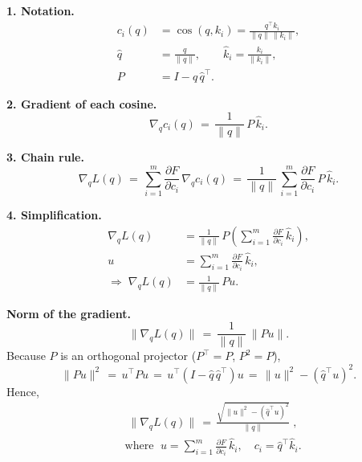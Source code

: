 \noindent\textbf{1. Notation.}
\begin{equation}
\begin{aligned}
c_i(q) &= \cos(q,k_i) = \frac{q^{\!\top}k_i}{\|q\|\,\|k_i\|}, \\
\hat q &= \frac{q}{\|q\|}, \qquad \hat k_i = \frac{k_i}{\|k_i\|}, \\
P &= I - \hat q\,\hat q^{\!\top}.
\end{aligned}
\end{equation}

\noindent\textbf{2. Gradient of each cosine.}
\begin{equation}
\nabla_q c_i(q) \,=\, \frac{1}{\|q\|}\,P\,\hat k_i.
\end{equation}

\noindent\textbf{3. Chain rule.}
\begin{equation}
\nabla_q L(q) \,=\, \sum_{i=1}^{m} \frac{\partial F}{\partial c_i}\,\nabla_q c_i(q) \,=\, \frac{1}{\|q\|}\,\sum_{i=1}^{m} \frac{\partial F}{\partial c_i}\,P\,\hat k_i.
\end{equation}

\noindent\textbf{4. Simplification.}
\begin{equation}
\begin{aligned}
\nabla_q L(q)
&= \frac{1}{\|q\|}\,P\left( \sum_{i=1}^{m} \frac{\partial F}{\partial c_i}\,\hat k_i \right), \\
u &= \sum_{i=1}^{m} \frac{\partial F}{\partial c_i}\,\hat k_i, \\
\Rightarrow\; \nabla_q L(q) &= \frac{1}{\|q\|}\,P u.
\end{aligned}
\end{equation}

\noindent\textbf{Norm of the gradient.}
\begin{equation}
\bigl\|\nabla_q L(q)\bigr\| \,=\, \frac{1}{\|q\|}\,\bigl\|P u\bigr\|.
\end{equation}
Because $P$ is an orthogonal projector ($P^{\!\top}=P$, $P^2=P$),
\begin{equation}
\bigl\|P u\bigr\|^{2} \,=\, u^{\!\top} P u \,=\, u^{\!\top}(I - \hat q\,\hat q^{\!\top})u \,=\, \|u\|^{2} - (\hat q^{\!\top}u)^{2}.
\end{equation}
Hence,
\begin{equation}
\begin{aligned}
&\boxed{\; \bigl\|\nabla_q L(q)\bigr\| \,=\, \frac{\sqrt{\|u\|^{2} - (\hat q^{\!\top}u)^{2}}}{\|q\|} \;} , \\
&\text{where }\; u = \sum_{i=1}^{m} \frac{\partial F}{\partial c_i}\,\hat k_i, \quad c_i = \hat q^{\!\top}\hat k_i.
\end{aligned}
\end{equation}

